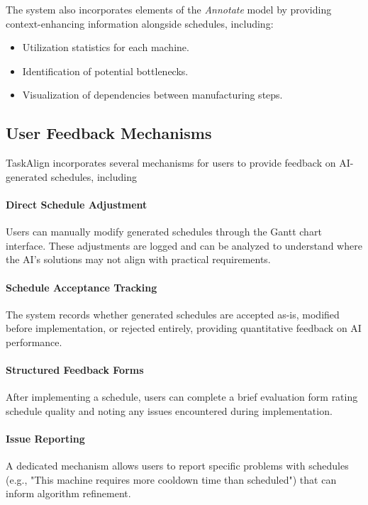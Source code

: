 The system also incorporates elements of the \textit{Annotate} model by providing context-enhancing information alongside schedules, including:
\begin{itemize}[nosep,leftmargin=*,topsep=2pt, partopsep=0pt, itemsep=1pt]
    \item Utilization statistics for each machine.
    \item Identification of potential bottlenecks.
    \item Visualization of dependencies between manufacturing steps.
\end{itemize}

\subsection{User Feedback Mechanisms}
\label{subsec:user_feedback_mechanisms_continued} %

TaskAlign incorporates several mechanisms for users to provide feedback on AI-generated schedules, including

\paragraph{Direct Schedule Adjustment}
Users can manually modify generated schedules through the Gantt chart interface. These adjustments are logged and can be analyzed to understand where the AI's solutions may not align with practical requirements.

\paragraph{Schedule Acceptance Tracking}
The system records whether generated schedules are accepted as-is, modified before implementation, or rejected entirely, providing quantitative feedback on AI performance.

\paragraph{Structured Feedback Forms}
After implementing a schedule, users can complete a brief evaluation form rating schedule quality and noting any issues encountered during implementation.

\paragraph{Issue Reporting}
A dedicated mechanism allows users to report specific problems with schedules (e.g., "This machine requires more cooldown time than scheduled") that can inform algorithm refinement.

